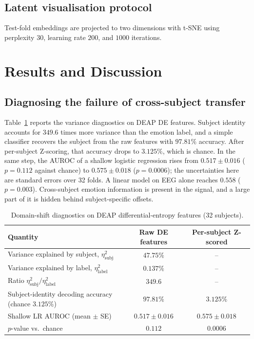 \documentclass[a4paper,fleqn]{cas-sc}
\begin{document}
\subsection{Latent visualisation protocol}
Test-fold embeddings are projected to two dimensions with t-SNE \citep{vandermaaten2008tsne} using perplexity $30$, learning rate $200$, and $1000$ iterations.

\section{Results and Discussion}
\label{sec:results}

\subsection{Diagnosing the failure of cross-subject transfer}
Table~\ref{tab:diag} reports the variance diagnostics on DEAP DE features. Subject identity accounts for $349.6$ times more variance than the emotion label, and a simple classifier recovers the subject from the raw features with $97.81\%$ accuracy. After per-subject Z-scoring, that accuracy drops to $3.125\%$, which is chance. In the same step, the AUROC of a shallow logistic regression rises from $0.517\pm0.016$ ($p=0.112$ against chance) to $0.575\pm0.018$ ($p=0.0006$); the uncertainties here are standard errors over 32 folds. A linear model on EEG alone reaches $0.558$ ($p=0.003$). Cross-subject emotion information is present in the signal, and a large part of it is hidden behind subject-specific offsets.

\begin{table}[t]
\centering
\caption{Domain-shift diagnostics on DEAP differential-entropy features (32 subjects).}
\label{tab:diag}
\small
\begin{tabular}{lcc}
\toprule
Quantity & Raw DE features & Per-subject Z-scored \\
\midrule
Variance explained by subject, $\eta^2_{\mathrm{subj}}$ & $47.75\%$ & -- \\
Variance explained by label, $\eta^2_{\mathrm{label}}$ & $0.137\%$ & -- \\
Ratio $\eta^2_{\mathrm{subj}}/\eta^2_{\mathrm{label}}$ & $349.6$ & -- \\
Subject-identity decoding accuracy (chance $3.125\%$) & $97.81\%$ & $3.125\%$ \\
Shallow LR AUROC (mean $\pm$ SE) & $0.517\pm0.016$ & $0.575\pm0.018$ \\
$p$-value vs.\ chance & $0.112$ & $0.0006$ \\
\bottomrule
\end{tabular}
\end{table}
\end{document}
